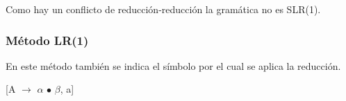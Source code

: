 \documentclass[\main/ApuntesPL.tex]{subfiles}
\begin{document}
        \par
        Como hay un conflicto de reducción-reducción la gramática no es SLR(1).

      \subsubsection{Método LR(1)}
        \par
        En este método también se indica el símbolo por el cual se aplica la
        reducción.
        \begin{center}
          [A $\rightarrow$ $\alpha$ $\bullet$ $\beta$, a]
        \end{center}
\end{document}
